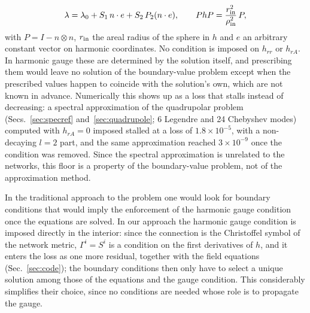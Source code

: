 \documentclass[aps,prd,twocolumn,superscriptaddress, nofootinbib,floatfix]{revtex4-2}
\begin{document}
\begin{equation}
  \lambda = \lambda_0 + S_1\, n\cdot e + S_2\, P_2(n\cdot e), \qquad
  P h P = \frac{r_{\rm in}^2}{\rho_{\rm in}^2}\, P ,
  \label{eq:innerbc}
\end{equation}
with $P = I - n\otimes n$, $r_{\rm in}$ the areal radius of the sphere in $h$ and $e$ an arbitrary constant vector on harmonic coordinates.
No condition is imposed on $h_{rr}$ or $h_{rA}$.
In harmonic gauge these are determined by the solution itself, and prescribing them would leave no solution of the boundary-value problem except when the prescribed values happen to coincide with the solution's own, which are not known in advance.
Numerically this shows up as a loss that stalls instead of decreasing: a spectral approximation of the quadrupolar problem (Secs.~\ref{sec:specref} and~\ref{sec:quadrupole}; 6 Legendre and 24 Chebyshev modes) computed with $h_{rA}=0$ imposed stalled at a loss of $1.8\times10^{-5}$, with a non-decaying $l=2$ part, and the same approximation reached $3\times10^{-9}$ once the condition was removed.
Since the spectral approximation is unrelated to the networks, this floor is a property of the boundary-value problem, not of the approximation method.

In the traditional approach to the problem one would look for boundary conditions that would imply the enforcement of the harmonic gauge condition once the equations are solved.
In our approach the harmonic gauge condition is imposed directly in the interior: since the connection is the Christoffel symbol of the network metric, $\Gamma^i=S^i$ is a condition on the first derivatives of $h$, and it enters the loss as one more residual, together with the field equations (Sec.~\ref{sec:code}); the boundary conditions then only have to select a unique solution among those of the equations and the gauge condition.
This considerably simplifies their choice, since no conditions are needed whose role is to propagate the gauge.
\end{document}
